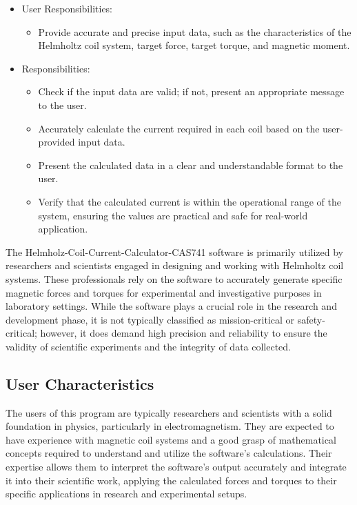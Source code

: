 \documentclass[12pt]{article}
\begin{document}
\begin{itemize}
\item User Responsibilities:
\begin{itemize}
\item Provide accurate and precise input data, such as the characteristics of the Helmholtz coil system, target force, target torque, and magnetic moment.

\end{itemize}
\item \progname{} Responsibilities:
\begin{itemize}
\item Check if the input data are valid; if not, present an appropriate message to the user.
\item Accurately calculate the current required in each coil based on the user-provided input data.
\item Present the calculated data in a clear and understandable format to the user.
\item Verify that the calculated current is within the operational range of the system, ensuring the values are practical and safe for real-world application.
\end{itemize}
\end{itemize}
{
The Helmholz-Coil-Current-Calculator-CAS741 software is primarily utilized by researchers and scientists engaged in designing and working with Helmholtz coil systems. These professionals rely on the software to accurately generate specific magnetic forces and torques for experimental and investigative purposes in laboratory settings. While the software plays a crucial role in the research and development phase, it is not typically classified as mission-critical or safety-critical; however, it does demand high precision and reliability to ensure the validity of scientific experiments and the integrity of data collected.
}

\subsection{User Characteristics} \label{SecUserCharacteristics}

The users of this program are typically researchers and scientists with a solid foundation in physics, particularly in electromagnetism. They are expected to have experience with magnetic coil systems and a good grasp of mathematical concepts required to understand and utilize the software's calculations. Their expertise allows them to interpret the software's output accurately and integrate it into their scientific work, applying the calculated forces and torques to their specific applications in research and experimental setups.
\end{document}
